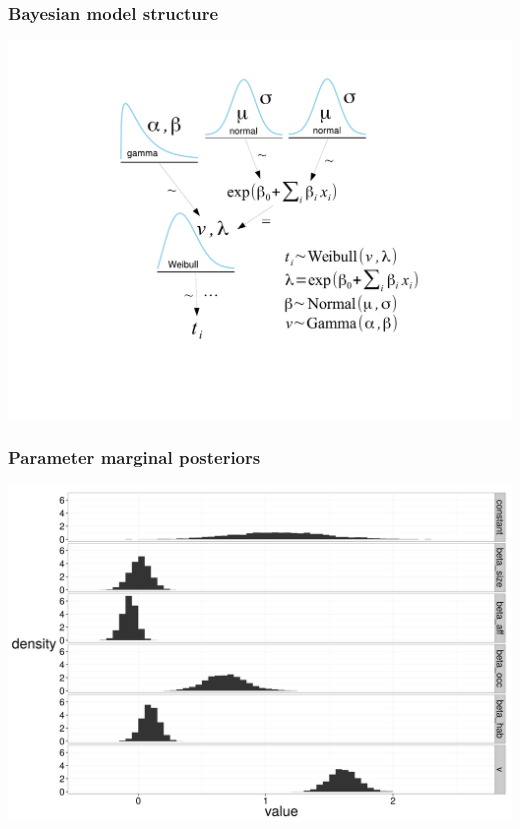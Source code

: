 \documentclass{beamer}
\begin{document}
\begin{frame}
  \frametitle{Bayesian model structure}
  \begin{center}
    \includegraphics[height = 0.8\textheight, width = \textwidth, keepaspectratio = true]{figure/surv_mod}
  \end{center}
\end{frame}


\begin{frame}
  \frametitle{Parameter marginal posteriors}
  \begin{center}
    \includegraphics[height = 0.8\textheight, width = \textwidth, keepaspectratio = true]{figure/wei_post}
  \end{center}
\end{frame}
\end{document}
